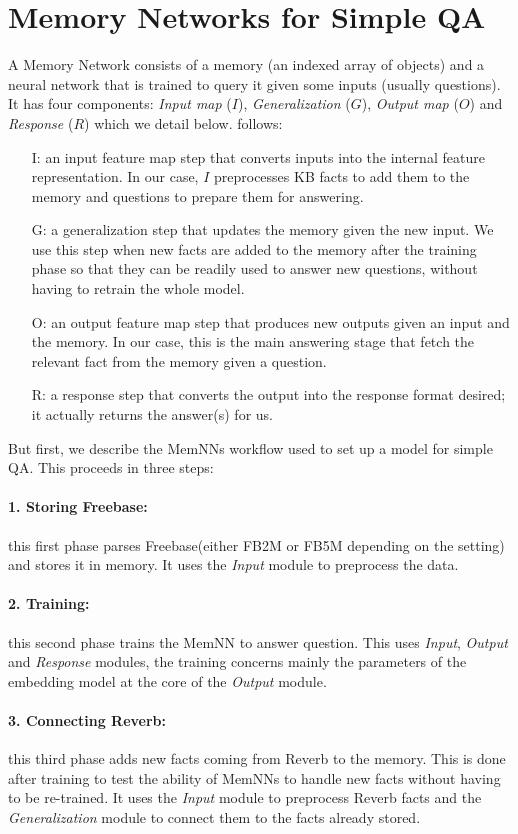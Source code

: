 \documentclass[11pt,a4paper]{article}
\newcommand{\fb}{{\sf Freebase}\xspace}
\newcommand{\rv}{{\sf Reverb}\xspace}
\newcommand{\fbs}{{\sf FB2M}\xspace}
\newcommand{\fbb}{{\sf FB5M}\xspace}
\begin{document}
\section{Memory Networks for Simple QA}
\label{sec:memnn}
A Memory Network consists of a memory (an indexed array of objects)
and a neural network that is trained to query it given some inputs
(usually questions). It has four components: {\it Input map} ($I$), {\it
  Generalization} ($G$), {\it Output map} ($O$) and {\it Response} ($R$)
which we detail below.
follows:
\begin{itemize}
\item[I:] an input feature map step that converts inputs into the internal
  feature representation. In our case, $I$ preprocesses KB facts to add
  them to the memory and questions to prepare them for answering.
\item[G:] a generalization step that updates the memory given the new
  input. We use this step when new facts are added to the memory after
  the training phase so that they can be readily used to answer new
  questions, without having to retrain the whole model.
\item[O:] an output feature map step that produces new outputs given
  an input and the memory. In our case, this is the main answering
  stage that fetch the relevant fact from the memory given a question.
\item[R:] a response step that converts the output into the response
  format desired; it actually returns the answer(s) for us.
\end{itemize}
\fi
But first, we describe the MemNNs workflow used to set up a model for
simple QA. This proceeds in three steps:
\paragraph{1. Storing Freebase:} this first phase parses \fb (either \fbs
  or \fbb depending on the setting) and stores it in memory. It uses
  the {\it Input} module to preprocess the data.
\paragraph{2. Training:} this second phase trains the MemNN to answer
  question. This uses {\it Input}, {\it Output} and {\it Response}
  modules, the training concerns mainly the parameters of the
  embedding model at the core of the  {\it Output} module.
\paragraph{3. Connecting Reverb:}this third phase adds new facts coming
  from \rv to the memory. This is done after training to test the
  ability of MemNNs to handle new facts without having to be
  re-trained. It uses the {\it Input} module to preprocess \rv facts and the {\it
    Generalization} module to connect them to the facts already
  stored.
\end{document}
